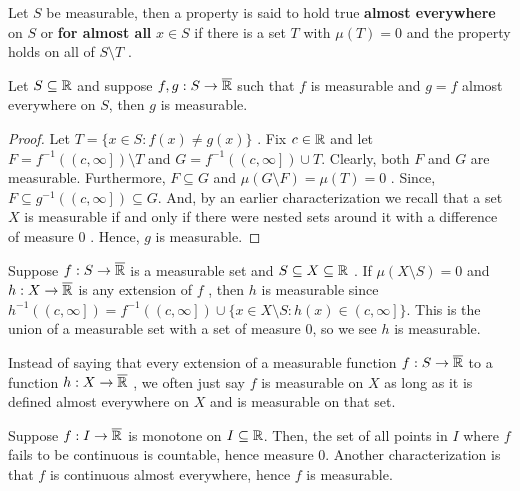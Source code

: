 \begin{definition}
	Let \(S\)	 be measurable, then a property is  said to hold true \textbf{almost everywhere} on \(S\)	 or \textbf{for almost all}	 \(x \in S\)	if there is a set \(T\)	 with \(\mu\left( T \right) = 0\)	 and the property holds on all of \(S \setminus T\)	.
\end{definition}
\begin{proposition}
	Let \(S \subseteq \mathbb{R}\) and suppose \(f, g: S \to \overline{\mathbb{R}}\) such that \(f\) is measurable and \(g=f\) almost everywhere on \(S\), then \(g\)  is measurable.
\end{proposition}
\begin{proof}
	Let \(T = \{x\in S : f\left( x \right)  \neq g\left( x \right) \} \) . Fix \(c \in \mathbb{R}\)  and let \(F = f^{-1}\left( \left( c, \infty \right] \right) \setminus T\)  and \(G = f^{-1}\left( \left( c, \infty \right]\right) \cup T \). Clearly, both \(F\)  and \(G\)  are measurable. Furthermore, \(F \subseteq G\)  and \( \mu\left( G \setminus F \right) = \mu\left( T \right) = 0\) . Since, \(F \subseteq g^{-1}\left( \left( c, \infty \right]  \right)  \subseteq G\). And, by an earlier characterization we recall that a set \(X\)  is measurable if and only if there were nested sets around it with a difference of measure \(0\) . Hence, \(g\)  is measurable.
\end{proof}
\begin{remark}
	Suppose \(f: S \to \overline{\mathbb{R}}\)  is a measurable set and \(S \subseteq X \subseteq \mathbb{R}\) . If \(\mu (X \setminus S) = 0 \)  and \(h: X \to \overline{\mathbb{R}}\)  is any extension of \(f\) , then \(h\)  is measurable since \(h^{-1}\left( \left( c, \infty \right]  \right)  = f^{-1}\left( \left( c, \infty \right]  \right)  \cup \{x \in X \setminus S : h\left( x \right)  \in \left( c, \infty \right] \} \). This is the union of a measurable set with a set of measure \(0\),  so we see \(h\)  is measurable.
\end{remark}
\begin{notation}
	Instead of saying that every extension of a measurable function \(f: S \to \overline{\mathbb{R}}\) to a function \(h: X \to \overline{\mathbb{R}}\) , we often just say \(f\)  is measurable on \(X\)  as long as it is defined almost everywhere on \(X\) and is measurable on that set.
\end{notation}
\begin{proposition}
Suppose \(f: I \to \overline{\mathbb{R}}\) is monotone on \(I \subseteq \mathbb{R}\). Then, the set of all points in \(I\)  where \(f\) fails to be continuous is countable, hence measure \(0\). Another characterization is that \(f\)  is continuous almost everywhere, hence \(f\)  is measurable.
\end{proposition}
